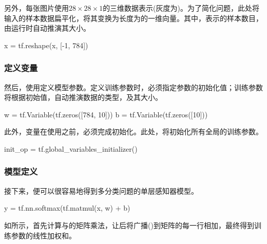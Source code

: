 \begin{content}
另外，每张图片使用$ 28 \times 28 \times 1 $的三维数据表示(灰度为)。为了简化问题，此处将输入的样本数据扁平化，将其变换为长度为的一维向量。其中，表示的样本数目，由运行时自动推演其大小。

\begin{leftbar}
\begin{python}
x = tf.reshape(x, [-1, 784])
\end{python}
\end{leftbar}

\subsubsection{定义变量}

然后，使用定义模型参数。定义训练参数时，必须指定参数的初始化值；训练参数将根据初始值，自动推演数据的类型，及其大小。

\begin{leftbar}
\begin{python}
w = tf.Variable(tf.zeros([784, 10]))
b = tf.Variable(tf.zeros([10]))
\end{python}
\end{leftbar}

此外，变量在使用之前，必须完成初始化。此处，将初始化所有全局的训练参数。

\begin{leftbar}
\begin{python}
init_op = tf.global_variables_initializer()
\end{python}
\end{leftbar}

\subsubsection{模型定义}

接下来，便可以很容易地得到多分类问题的单层感知器模型。

\begin{leftbar}
\begin{python}
y = tf.nn.softmax(tf.matmul(x, w) + b)
\end{python}
\end{leftbar}

如所示，首先计算与的矩阵乘法，让后将广播()到矩阵的每一行相加，最终得到训练参数的线性加权和。


\end{content}
